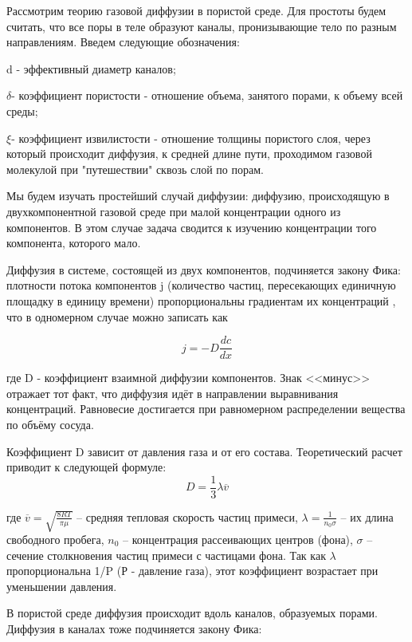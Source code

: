 \documentclass[a4paper,12pt]{article}
\begin{document}
Рассмотрим теорию газовой диффузии в пористой среде. Для простоты будем считать, что все поры в теле образуют каналы, пронизывающие тело по разным направлениям. Введем следующие обозначения:

d - эффективный диаметр каналов;

 $\delta $- коэффициент пористости - отношение объема, занятого порами, к объему всей среды;

 $\xi $- коэффициент извилистости - отношение толщины пористого слоя, через который происходит диффузия, к средней длине пути, проходимом газовой молекулой при "путешествии" сквозь слой по порам.

Мы будем изучать простейший случай диффузии: диффузию, происходящую в двухкомпонентной газовой среде при малой концентрации одного из компонентов. В этом случае задача сводится к изучению концентрации того компонента, которого мало.

Диффузия в системе, состоящей из двух компонентов, подчиняется закону Фика: плотности потока компонентов j (количество частиц, пересекающих единичную площадку в единицу времени) пропорциональны градиентам их концентраций , что в одномерном случае можно записать как

\[ j= -D\frac{dc}{dx} \]


где  D - коэффициент взаимной диффузии компонентов. Знак <<минус>> отражает тот факт, что диффузия идёт в направлении выравнивания концентраций. Равновесие достигается при равномерном распределении вещества по объёму сосуда.

Коэффициент D зависит от давления газа и от его состава. Теоретический расчет приводит к следующей формуле:
\begin{equation}
D=\frac{1}{3}\lambda \overline{v}
\end{equation}


где $ \overline{v}=\sqrt{\frac{8RT}{\pi \mu}} $ -- средняя тепловая скорость частиц примеси, $ \lambda = \frac{1}{n_0\sigma} $ -- их длина свободного пробега, $ n_0 $ -- концентрация рассеивающих центров (фона), $ \sigma $ -- сечение столкновения частиц примеси с частицами фона. Так как $\lambda $ пропорциональна 1/P (Р - давление газа), этот коэффициент возрастает при уменьшении давления. 

В пористой среде диффузия происходит вдоль каналов, образуемых порами. Диффузия в каналах тоже подчиняется закону Фика:
\end{document}
